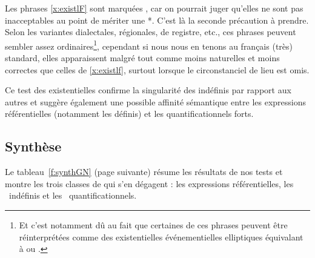 Les phrases \ref{x:existlF} sont marquées {\uurgh}, car on pourrait juger qu'elles ne sont pas inacceptables au point de mériter une *. 
C'est là la seconde précaution à prendre. 
Selon les variantes dialectales, régionales, de registre, etc., ces phrases peuvent sembler assez ordinaires\footnote{Et c'est notamment dû au fait que certaines de ces phrases peuvent être réinterprétées comme des existentielles événementielles elliptiques équivalant à  ou .}, cependant si nous nous en tenons au français (très) standard, elles apparaissent malgré tout comme moins naturelles et moins correctes que celles de \ref{x:existlf}, surtout lorsque le circonstanciel de lieu est omis.

Ce test des existentielles confirme la singularité des indéfinis par rapport aux autres {\GN} et suggère également une possible affinité sémantique entre les expressions référentielles (notamment les définis) et les {\GN} quantificationnels forts.  


\subsection{Synthèse}
\label{sss:SyntheseGN}

Le tableau~\ref{f:synthGN} (page suivante) résume les résultats de nos tests et montre les trois classes de {\GN} qui s'en dégagent : 
les expressions référentielles, les \GN\ indéfinis et les \GN\ quantificationnels.

